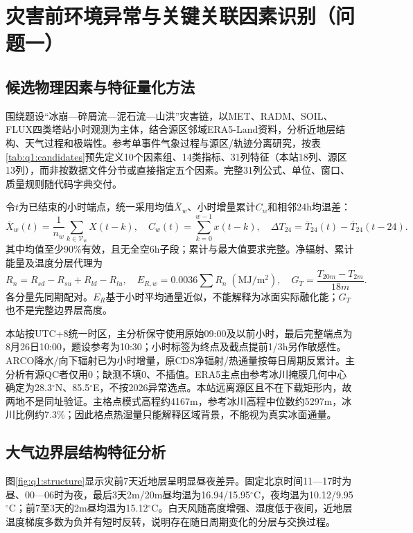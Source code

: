 \section{灾害前环境异常与关键关联因素识别（问题一）}\label{sec:factors}
\subsection{候选物理因素与特征量化方法}\label{sec:candidate-features}
围绕题设“冰崩—碎屑流—泥石流—山洪”灾害链，以MET、RADM、SOIL、FLUX四类塔站小时观测为主体，结合源区邻域ERA5-Land资料，分析近地层结构、天气过程和极端性。参考单事件气象过程与源区/轨迹分离研究\cite{Srivastava2022,Zhong2025}，按表\ref{tab:q1:candidates}预先定义10个因素组、14类指标、31列特征（本站18列、源区13列），而非按数据文件分节或直接指定五个因素。完整31列公式、单位、窗口、质量规则随代码字典交付。



令$t$为已结束的小时端点，统一采用均值$\overline X_w$、小时增量累计$C_w$和相邻24h均温差：
\begin{equation}
\overline X_w(t)=\frac{1}{n_w}\sum_{k\in\mathcal V_w}X(t-k),\quad C_w(t)=\sum_{k=0}^{w-1}x(t-k),\quad
\Delta T_{24}=\overline T_{24}(t)-\overline T_{24}(t-24).
\end{equation}
其中均值至少90\%有效，且无全空6h子段；累计与最大值要求完整。净辐射、累计能量及温度分层代理为
\begin{equation}
R_n=R_{sd}-R_{su}+R_{ld}-R_{lu},\quad E_{R,w}=0.0036\sum R_n\;(\mathrm{MJ/m^2}),\quad
G_T=\frac{T_{20m}-T_{2m}}{18m}.
\end{equation}
各分量先同期配对。$E_R$基于小时平均通量近似，不能解释为冰面实际融化能；$G_T$也不是完整边界层高度。

本站按UTC+8统一时区，主分析保守使用原始09:00及以前小时，最后完整端点为8月26日10:00，题设参考为10:30；小时标签为终点及截点提前1/3h另作敏感性。ARCO降水/向下辐射已为小时增量，原CDS净辐射/热通量按每日周期反累计\cite{ERA5,ERA5ARCO}。主分析有源QC者仅用0；缺测不填0、不插值。ERA5主点由参考冰川掩膜几何中心确定为28.3$^\circ$N、85.5$^\circ$E，不按2026异常选点。本站远离源区且不在下载矩形内，故两地不是同址验证。主格点模式高程约4167m，参考冰川高程中位数约5297m，冰川比例约7.3\%；因此格点热湿量只能解释区域背景，不能视为真实冰面通量。

\subsection{大气边界层结构特征分析}\label{sec:q1:boundary-layer}
图\ref{fig:q1:structure}显示灾前7天近地层呈明显昼夜差异。固定北京时间11—17时为昼、00—06时为夜，最后3天2m/20m昼均温为16.94/15.95$^\circ$C，夜均温为10.12/9.95$^\circ$C；前7至3天的2m昼均温为15.12$^\circ$C。白天风随高度增强、湿度低于夜间，近地层温度梯度多数为负并有短时反转，说明存在随日周期变化的分层与交换过程。


